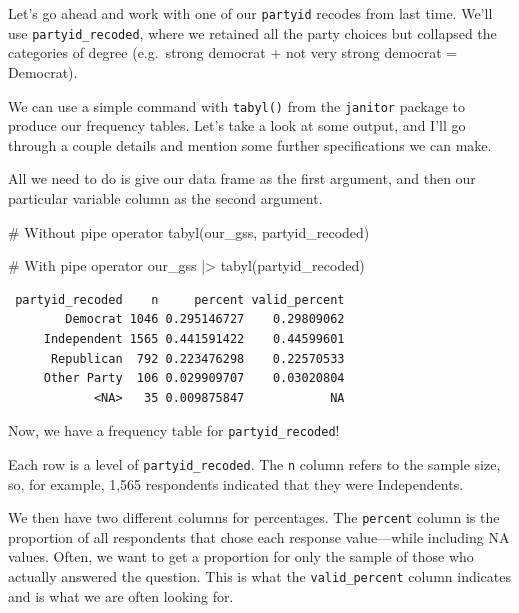 \documentclass[
  letterpaper,
  DIV=11,
  numbers=noendperiod]{scrreprt}
\newenvironment{Shaded}{\begin{snugshade}}{\end{snugshade}}
\newcommand{\CommentTok}[1]{\textcolor[rgb]{0.37,0.37,0.37}{#1}}
\newcommand{\FunctionTok}[1]{\textcolor[rgb]{0.28,0.35,0.67}{#1}}
\newcommand{\NormalTok}[1]{\textcolor[rgb]{0.00,0.23,0.31}{#1}}
\newcommand{\SpecialCharTok}[1]{\textcolor[rgb]{0.37,0.37,0.37}{#1}}
\begin{document}
Let's go ahead and work with one of our \texttt{partyid} recodes from
last time. We'll use \texttt{partyid\_recoded}, where we retained all
the party choices but collapsed the categories of degree (e.g.~strong
democrat + not very strong democrat = Democrat).

We can use a simple command with \texttt{tabyl()} from the
\texttt{janitor} package to produce our frequency tables. Let's take a
look at some output, and I'll go through a couple details and mention
some further specifications we can make.

All we need to do is give our data frame as the first argument, and then
our particular variable column as the second argument.

\begin{Shaded}
\begin{Highlighting}[]
\CommentTok{\# Without pipe operator}
\FunctionTok{tabyl}\NormalTok{(our\_gss, partyid\_recoded)}
\end{Highlighting}
\end{Shaded}

\begin{Shaded}
\begin{Highlighting}[]
\CommentTok{\# With pipe operator}
\NormalTok{our\_gss }\SpecialCharTok{|\textgreater{}}
  \FunctionTok{tabyl}\NormalTok{(partyid\_recoded)}
\end{Highlighting}
\end{Shaded}

\begin{verbatim}
 partyid_recoded    n     percent valid_percent
        Democrat 1046 0.295146727    0.29809062
     Independent 1565 0.441591422    0.44599601
      Republican  792 0.223476298    0.22570533
     Other Party  106 0.029909707    0.03020804
            <NA>   35 0.009875847            NA
\end{verbatim}

Now, we have a frequency table for \texttt{partyid\_recoded}!

Each row is a level of \texttt{partyid\_recoded}. The \texttt{n} column
refers to the sample size, so, for example, 1,565 respondents indicated
that they were Independents.

We then have two different columns for percentages. The \texttt{percent}
column is the proportion of all respondents that chose each response
value---while including NA values. Often, we want to get a proportion
for only the sample of those who actually answered the question. This is
what the \texttt{valid\_percent} column indicates and is what we are
often looking for.
\end{document}
